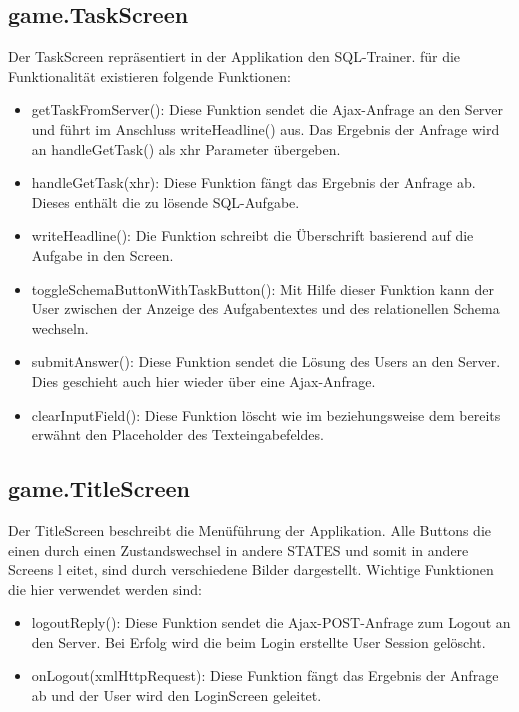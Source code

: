 \subsection{game.TaskScreen}
\label{Task}  
Der TaskScreen repr\"asentiert in der Applikation den SQL-Trainer. f\"ur die Funktionalit\"at existieren folgende Funktionen:
\begin{itemize} 
	\item getTaskFromServer(): Diese Funktion sendet die Ajax-Anfrage an den Server und f\"uhrt im Anschluss writeHeadline() aus. Das Ergebnis der Anfrage wird
		an handleGetTask() als xhr Parameter \"ubergeben.
	\item handleGetTask(xhr): Diese Funktion f\"angt das Ergebnis der Anfrage ab. Dieses enth\"alt die zu l\"osende SQL-Aufgabe.
	\item writeHeadline(): Die Funktion schreibt die \"Uberschrift basierend auf die Aufgabe in den Screen.      
	\item toggleSchemaButtonWithTaskButton(): Mit Hilfe dieser Funktion kann der User zwischen der Anzeige des Aufgabentextes und des relationellen Schema 
		wechseln.
	\item submitAnswer(): Diese Funktion sendet die L\"osung des Users an den Server. Dies geschieht auch hier wieder \"uber eine Ajax-Anfrage.
	\item clearInputField(): Diese Funktion l\"oscht wie im  beziehungsweise dem  bereits erw\"ahnt den Placeholder des Texteingabefeldes.
\end{itemize}        

\subsection{game.TitleScreen}
\label{Title}  
Der TitleScreen beschreibt die Men\"uf\"uhrung der Applikation. Alle Buttons die einen durch einen Zustandswechsel in andere STATES und somit in andere Screens l
eitet, sind durch verschiedene Bilder dargestellt. Wichtige Funktionen die hier verwendet werden sind:
\begin{itemize} 
	\item logoutReply(): Diese Funktion sendet die Ajax-POST-Anfrage zum Logout an den Server. Bei Erfolg wird die beim Login erstellte User Session gel\"oscht.
	\item onLogout(xmlHttpRequest): Diese Funktion f\"angt das Ergebnis der Anfrage ab und der User wird den LoginScreen geleitet.
\end{itemize}    

